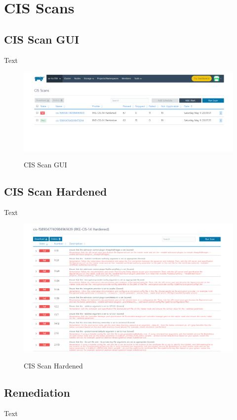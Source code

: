 %
%

\pagebreak
\section{CIS Scans}

\onehalfspacing

\subsection{CIS Scan GUI}

Text 

\begin{figure}[H]
\centering
\caption {CIS Scan GUI}
\includegraphics[width=\linewidth]{images/cis-scan-overview.png}
\label{fig:cisScanOverview}
\end{figure}

\subsection{CIS Scan Hardened}

Text 

\begin{figure}[H]
\centering
\caption {CIS Scan Hardened}
\includegraphics[width=\linewidth]{images/cis-scan-detail.png}
\label{fig:cisScanDetails}
\end{figure}

\subsection{Remediation}

Text
